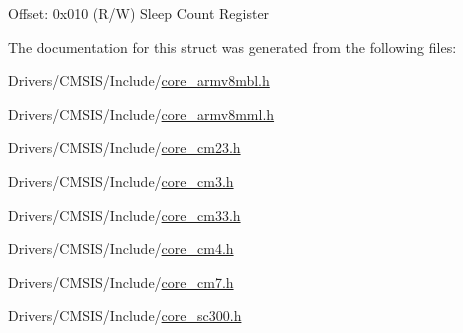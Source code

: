 Offset\+: 0x010 (R/W) Sleep Count Register 

The documentation for this struct was generated from the following files\+:\begin{DoxyCompactItemize}
\item 
Drivers/\+C\+M\+S\+I\+S/\+Include/\hyperlink{core__armv8mbl_8h}{core\+\_\+armv8mbl.\+h}\item 
Drivers/\+C\+M\+S\+I\+S/\+Include/\hyperlink{core__armv8mml_8h}{core\+\_\+armv8mml.\+h}\item 
Drivers/\+C\+M\+S\+I\+S/\+Include/\hyperlink{core__cm23_8h}{core\+\_\+cm23.\+h}\item 
Drivers/\+C\+M\+S\+I\+S/\+Include/\hyperlink{core__cm3_8h}{core\+\_\+cm3.\+h}\item 
Drivers/\+C\+M\+S\+I\+S/\+Include/\hyperlink{core__cm33_8h}{core\+\_\+cm33.\+h}\item 
Drivers/\+C\+M\+S\+I\+S/\+Include/\hyperlink{core__cm4_8h}{core\+\_\+cm4.\+h}\item 
Drivers/\+C\+M\+S\+I\+S/\+Include/\hyperlink{core__cm7_8h}{core\+\_\+cm7.\+h}\item 
Drivers/\+C\+M\+S\+I\+S/\+Include/\hyperlink{core__sc300_8h}{core\+\_\+sc300.\+h}\end{DoxyCompactItemize}
